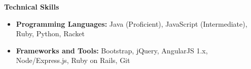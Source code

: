 \documentclass[letterpaper,11pt]{article}
\newcommand{\resitem}[1]{\item #1 \vspace{-2pt}}
\newcommand{\resitemskills}[1]{\item #1 \vspace{-4pt}}
\newcommand{\resheading}[1]{{\large \colorbox{mygrey}{\begin{minipage}{\textwidth}{\textbf{#1 \vphantom{p\^{E}}}}\end{minipage}}}}
\begin{document}
    \resheading{Technical Skills}
    \begin{itemize}
        \item
        {\bf Programming Languages:}
        \vspace{-0.2cm} Java (Proficient), JavaScript (Intermediate), Ruby, Python, Racket

        \item
        {\bf Frameworks and Tools:}
        \vspace{-0cm} Bootstrap, jQuery, AngularJS 1.x, Node/Express.js, Ruby on Rails, Git

    \end{itemize}



\end{document}
